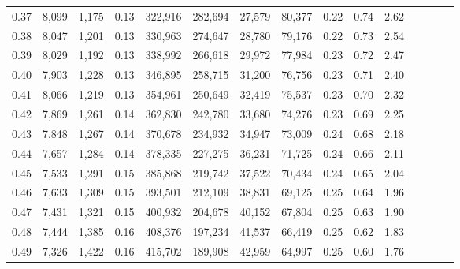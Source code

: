 \begin{tabular}{rrrcrrrrrrrrrrr}
0.37 &   8,099 &   1,175 &                                       0.13 &  322,916 &  282,694 &   27,579 &   80,377 &  0.22 &  0.74 &                         2.62 \\
0.38 &   8,047 &   1,201 &                                       0.13 &  330,963 &  274,647 &   28,780 &   79,176 &  0.22 &  0.73 &                         2.54 \\
0.39 &   8,029 &   1,192 &                                       0.13 &  338,992 &  266,618 &   29,972 &   77,984 &  0.23 &  0.72 &                         2.47 \\
0.40 &   7,903 &   1,228 &                                       0.13 &  346,895 &  258,715 &   31,200 &   76,756 &  0.23 &  0.71 &                         2.40 \\
0.41 &   8,066 &   1,219 &                                       0.13 &  354,961 &  250,649 &   32,419 &   75,537 &  0.23 &  0.70 &                         2.32 \\
0.42 &   7,869 &   1,261 &                                       0.14 &  362,830 &  242,780 &   33,680 &   74,276 &  0.23 &  0.69 &                         2.25 \\
0.43 &   7,848 &   1,267 &                                       0.14 &  370,678 &  234,932 &   34,947 &   73,009 &  0.24 &  0.68 &                         2.18 \\
0.44 &   7,657 &   1,284 &                                       0.14 &  378,335 &  227,275 &   36,231 &   71,725 &  0.24 &  0.66 &                         2.11 \\
0.45 &   7,533 &   1,291 &                                       0.15 &  385,868 &  219,742 &   37,522 &   70,434 &  0.24 &  0.65 &                         2.04 \\
0.46 &   7,633 &   1,309 &                                       0.15 &  393,501 &  212,109 &   38,831 &   69,125 &  0.25 &  0.64 &                         1.96 \\
0.47 &   7,431 &   1,321 &                                       0.15 &  400,932 &  204,678 &   40,152 &   67,804 &  0.25 &  0.63 &                         1.90 \\
0.48 &   7,444 &   1,385 &                                       0.16 &  408,376 &  197,234 &   41,537 &   66,419 &  0.25 &  0.62 &                         1.83 \\
0.49 &   7,326 &   1,422 &                                       0.16 &  415,702 &  189,908 &   42,959 &   64,997 &  0.25 &  0.60 &                         1.76 \\

\end{tabular}
